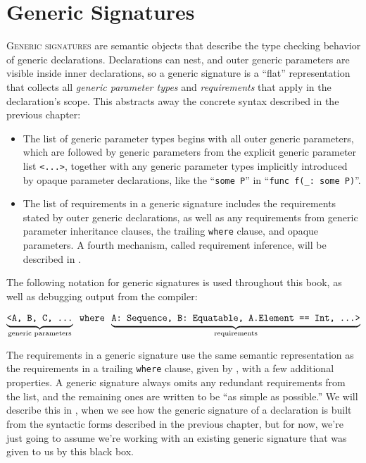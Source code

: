 \documentclass[../generics]{subfiles}
\begin{document}
\chapter{Generic Signatures}\label{genericsig}

\lettrine{G}{eneric signatures} are semantic objects that describe the type checking behavior of generic declarations. Declarations can nest, and outer generic parameters are visible inside inner declarations, so a generic signature is a ``flat'' representation that collects all \emph{generic parameter types} and \emph{requirements} that apply in the declaration's scope. This abstracts away the concrete syntax described in the previous chapter:
\begin{itemize}
\item The list of generic parameter types begins with all outer generic parameters, which are followed by generic parameters from the explicit generic parameter list \texttt{<...>}, together with any generic parameter types implicitly introduced by opaque parameter declarations, like the ``\texttt{some P}'' in ``\verb|func f(_: some P)|''.
\item The list of requirements in a generic signature includes the requirements stated by outer generic declarations, as well as any requirements from generic parameter inheritance clauses, the trailing \texttt{where} clause, and opaque parameters. A fourth mechanism, called requirement inference, will be described in .
\end{itemize}

The following notation for generic signatures is used throughout this book, as well as debugging output from the compiler:
\begin{ceqn}
\[\underbrace{\mathstrut\texttt{<A, B, C, ...}}_{\text{generic parameters}}\texttt{ where }\underbrace{\mathstrut\texttt{A:\ Sequence, B:\ Equatable, A.Element == Int, ...>}}_{\text{requirements}}\]
\end{ceqn}

The requirements in a generic signature use the same semantic representation as the requirements in a trailing \texttt{where} clause, given by , with a few additional properties. A generic signature always omits any redundant requirements from the list, and the remaining ones are written to be ``as simple as possible.'' We will describe this in , when we see how the generic signature of a declaration is built from the syntactic forms described in the previous chapter, but for now, we're just going to assume we're working with an existing generic signature that was given to us by this black box.
\end{document}
